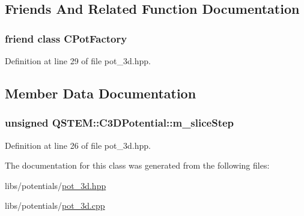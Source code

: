 \subsection{Friends And Related Function Documentation}
\hypertarget{class_q_s_t_e_m_1_1_c3_d_potential_a6759f7ccac4d3744ec78fd194903e752}{
\subsubsection[{C\-Pot\-Factory}]{\setlength{\rightskip}{0pt plus 5cm}friend class {\bf C\-Pot\-Factory}\hspace{0.3cm}{\ttfamily [friend]}}}\label{class_q_s_t_e_m_1_1_c3_d_potential_a6759f7ccac4d3744ec78fd194903e752}


Definition at line 29 of file pot\-\_\-3d.\-hpp.



\subsection{Member Data Documentation}
\hypertarget{class_q_s_t_e_m_1_1_c3_d_potential_a50fb67b2668c1b5915c20b3d195e1251}{
\subsubsection[{m\-\_\-slice\-Step}]{\setlength{\rightskip}{0pt plus 5cm}unsigned Q\-S\-T\-E\-M\-::\-C3\-D\-Potential\-::m\-\_\-slice\-Step\hspace{0.3cm}{\ttfamily [protected]}}}\label{class_q_s_t_e_m_1_1_c3_d_potential_a50fb67b2668c1b5915c20b3d195e1251}


Definition at line 26 of file pot\-\_\-3d.\-hpp.



The documentation for this class was generated from the following files\-:\begin{DoxyCompactItemize}
\item 
libs/potentials/\hyperlink{pot__3d_8hpp}{pot\-\_\-3d.\-hpp}\item 
libs/potentials/\hyperlink{pot__3d_8cpp}{pot\-\_\-3d.\-cpp}\end{DoxyCompactItemize}
